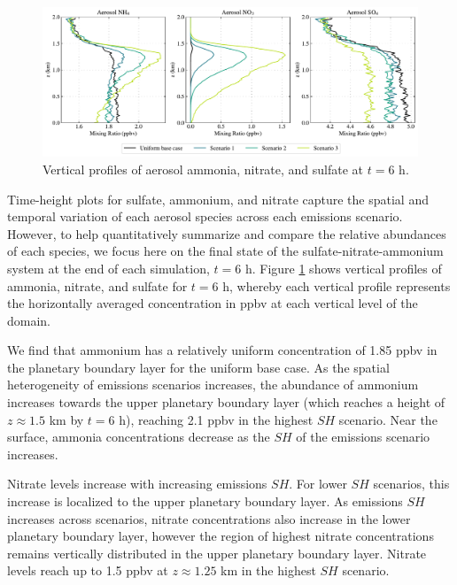 
\begin{figure}[!t]
  \centering
    \includegraphics[width=\textwidth]{figures/chapter5/aerosol-SNA-vertical-profiles-time36.pdf}
    \caption{Vertical profiles of aerosol ammonia, nitrate, and sulfate at $t=6$ h.}
    \label{fig:sna-vertical-profile}
\end{figure}

Time-height plots for sulfate, ammonium, and nitrate capture the spatial and temporal variation of each aerosol species across each emissions scenario. However, to help quantitatively summarize and compare the relative abundances of each species, we focus here on the final state of the sulfate-nitrate-ammonium system at the end of each simulation, $t=6$ h. Figure \ref{fig:sna-vertical-profile} shows vertical profiles of ammonia, nitrate, and sulfate for $t=6$ h, whereby each vertical profile represents the horizontally averaged concentration in ppbv at each vertical level of the domain.

We find that ammonium has a relatively uniform concentration of 1.85 ppbv in the planetary boundary layer for the uniform base case. As the spatial heterogeneity of emissions scenarios increases, the abundance of ammonium increases towards the upper planetary boundary layer (which reaches a height of $z\approx1.5$ km by $t=6$ h), reaching 2.1 ppbv in the highest $SH$ scenario. Near the surface, ammonia concentrations decrease as the $SH$ of the emissions scenario increases. 

Nitrate levels increase with increasing emissions $SH$. For lower $SH$ scenarios, this increase is localized to the upper planetary boundary layer. As emissions $SH$ increases across scenarios, nitrate concentrations also increase in the lower planetary boundary layer, however the region of highest nitrate concentrations remains vertically distributed in the upper planetary boundary layer. Nitrate levels reach up to 1.5 ppbv at $z\approx1.25$ km in the highest $SH$ scenario.  

